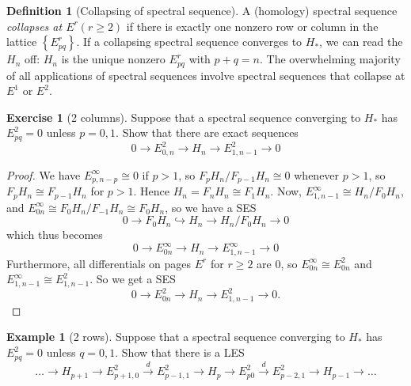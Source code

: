 \documentclass[reqno]{amsart}
\theoremstyle{definition}
\newtheorem{definition}[theorem]{Definition}
\newtheorem{example}[theorem]{Example}
\newtheorem{exercise}[theorem]{Exercise}
\theoremstyle{remark}
\begin{document}
    \begin{definition}[Collapsing of spectral sequence]
        A (homology) spectral sequence
        \textit{collapses at $E^{r} (r \ge 2)$} if there
        is exactly one nonzero row or column in the lattice
        $\left\{ E_{pq}^{r} \right\} $. If a collapsing spectral
        sequence converges to $H_*$, we can read the $H_n$ off:
        $H_n$ is the unique nonzero $E_{pq}^{r}$ with
        $p+q=n$. The overwhelming majority of all applications
        of spectral sequences involve spectral sequences
        that collapse at $E^{1}$ or $E^2$.
    \end{definition}

    \begin{exercise}[2 columns]
        Suppose that a spectral sequence
        converging to $H_*$ has $E_{pq}^2 = 0$ unless
        $p = 0,1$. Show that there are exact sequences
        \[
        0 \to E_{0, n}^2 \to H_n \to E_{1,n-1}^2 \to 0
        \] 
    \end{exercise}

    \begin{proof}
        We have $E_{p,n-p}^{\infty} \cong 0$ if
        $p>1$, so
        $F_{p}H_n / F_{p-1} H_n \cong 0$ whenever
        $p>1$, so
        $F_p H_n \cong F_{p-1} H_n$ for $p>1$.
        Hence $H_n = F_n H_n \cong F_1 H_n$.  
        Now, $E_{1,n-1}^{\infty} \cong
        H_n / F_0 H_n$, and
        $E_{0n}^{\infty} \cong
        F_0 H_n / F_{-1} H_n \cong
        F_0 H_n$, so
        we have a SES
        \[
        0 \to F_0 H_n \hookrightarrow  H_n \to H_n / F_0 H_n \to 0
        \] 
        which thus becomes
        \[
        0 \to E_{0n}^{\infty} \to 
        H_n \to E_{1,n-1}^{\infty} \to 0
        \] 
        Furthermore, all differentials on pages
        $E^{r}$ for $r\ge 2$ are $0$, so
        $E_{0n}^{\infty} \cong
        E_{0n}^2$ and
        $E_{1,n-1}^{\infty} \cong
        E_{1,n-1}^{2}$.
        So we get
        a SES
        \[
        0 \to E_{0n}^2 \to H_n \to E_{1,n-1}^2 \to 0.
        \]
    \end{proof}


    \begin{example}[2 rows]
        Suppose that a spectral sequence
        converging to $H_*$ has $E_{pq}^2 = 0$ unless
        $q = 0,1$. Show that there is a LES
        \[
        \ldots \to H_{p+1} \to E_{p+1,0}^2
        \stackrel{d}{\to} E_{p-1,1}^2 \to H_p
        \to E_{p 0}^2 \stackrel{d}{\to} 
        E_{p-2,1}^2 \to H_{p-1} \to \ldots
        \] 
    \end{example}
\end{document}
